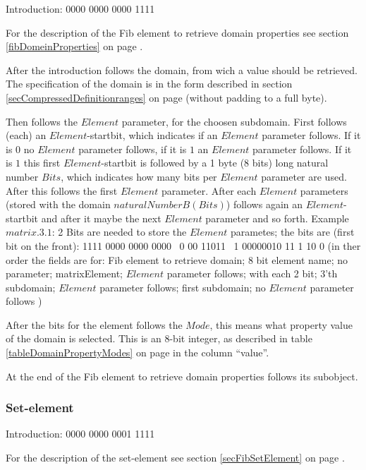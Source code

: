 Introduction: 0000 0000 0000 1111

\bigskip\noindent
For the description of the Fib element to retrieve domain properties see section \ref{fibDomeinProperties} on page \pageref{fibDomeinProperties} .

After the introduction follows the domain, from wich a value should be retrieved. The specification of the domain is in the form described in section \ref{secCompressedDefinitionranges} on page \pageref{secCompressedDefinitionranges} (without padding to a full byte).

Then follows the $Element$ parameter, for the choosen subdomain. First follows (each) an $Element$-startbit, which indicates if an $Element$ parameter follows. If it is $0$ no $Element$ parameter follows, if it is $1$ an $Element$ parameter follows. If it is $1$ this first $Element$-startbit is followed by a 1 byte (8 bits) long natural number $Bits$, which indicates how many bits per $Element$ parameter are used. After this follows the first $Element$ parameter. After each $Element$ parameters (stored with the domain $naturalNumberB ( Bits )$) follows again an $Element$-startbit and after it maybe the next $Element$ parameter and so forth. Example $matrix.3.1$: 2 Bits are needed to store the $Element$ parametes; the bits are (first bit on the front): 1111 0000 0000 0000 \ 0 00 11011 \ 1 00000010 11  1 10  0 (in ther order the fields are for: Fib element to retrieve domain; 8 bit element name; no parameter; matrixElement; $Element$ parameter follows; with each 2 bit; 3'th subdomain; $Element$ parameter follows; first subdomain; no $Element$ parameter follows )

After the bits for the element follows the $Mode$, this means what property value of the domain is selected. This is an 8-bit integer, as described in table \ref{tableDomainPropertyModes} on page \pageref{tableDomainPropertyModes} in the column ``value''.

At the end of the Fib element to retrieve domain properties follows its subobject.


\subsubsection{Set-element}
\label{secCompressedFibSet}

Introduction: 0000 0000 0001 1111

\bigskip\noindent
For the description of the set-element see section \ref{secFibSetElement} on page \pageref{secFibSetElement} .

